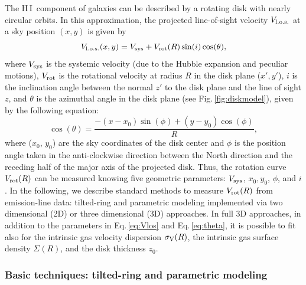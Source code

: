 \documentclass[a4paper,11pt]{article}
\newcommand{\hi } {{\rm H}\,{\small\rm I}}
\begin{document}
The \hi\ component of galaxies can be described by a rotating disk with nearly circular orbits. In this approximation, the projected line-of-sight velocity $V_{\rm l.o.s.}$ at a sky position $(x, y)$ is given by
\begin{equation}\label{eq:Vlos}
 V_{\rm l.o.s.}(x, y) = V_{\rm sys} + V_{\rm rot}(R)\sin(i)\cos(\theta),
\end{equation}
where $V_{\rm sys}$ is the systemic velocity (due to the Hubble expansion and peculiar motions), $V_{\rm rot}$ is the rotational velocity at radius $R$ in the disk plane ($x', y'$), $i$ is the inclination angle between the normal $z'$ to the disk plane and the line of sight $z$, and $\theta$ is the azimuthal angle in the disk plane (see Fig.\,\ref{fig:diskmodel}), given by the following equation:
\begin{equation}\label{eq:theta}
 \cos(\theta) = \dfrac{-(x - x_{0})\sin(\phi) + (y - y_{0})\cos(\phi)}{R},
\end{equation}
where ($x_0$, $y_0$) are the sky coordinates of the disk center and $\phi$ is the position angle taken in the anti-clockwise direction between the North direction and the receding half of the major axis of the projected disk. Thus, the rotation curve $V_{\rm rot}(R)$ can be measured knowing five geometric parameters: $V_{\rm sys}$, $x_0, y_0$, $\phi$, and $i$. In the following, we describe standard methods to measure $V_{\rm rot}(R)$ from emission-line data: tilted-ring and parametric modeling implemented via two dimensional (2D) or three dimensional (3D) approaches. In full 3D approaches, in addition to the parameters in Eq.\,\ref{eq:Vlos} and Eq.\,\ref{eq:theta}, it is possible to fit also for the intrinsic gas velocity dispersion $\sigma_{\rm V}(R)$, the intrinsic gas surface density $\Sigma(R)$, and the disk thickness $z_0$.

\subsubsection{Basic techniques: tilted-ring and parametric modeling}\label{sec:techniques}
\end{document}
